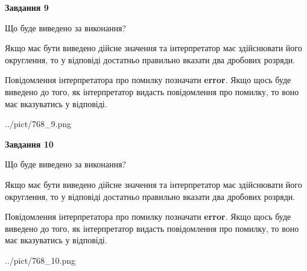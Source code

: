 \documentclass[12pt, ukrainian]{article}
\begin{document}
{\begin {Large}
{\begin {center}\textbf{Завдання 9}\end {center}}\par
Що буде виведено за виконання? \par

Якщо має бути виведено дійсне значення та інтерпретатор має здійснювати його округлення, 
то у відповіді достатньо правильно вказати два дробових розряди.

Повідомлення інтерпретатора про помилку позначати \textbf{error}.
Якщо щось буде виведено до того, як інтерпретатор видасть повідомлення про помилку, 
то воно має вказуватись у відповіді. \par

\begin{center}
	{../pict/768_9.png}
\end{center}
\newpage

{\begin {center}\textbf{Завдання 10}\end {center}}\par
Що буде виведено за виконання? \par

Якщо має бути виведено дійсне значення та інтерпретатор має здійснювати його округлення, 
то у відповіді достатньо правильно вказати два дробових розряди.

Повідомлення інтерпретатора про помилку позначати \textbf{error}.
Якщо щось буде виведено до того, як інтерпретатор видасть повідомлення про помилку, 
то воно має вказуватись у відповіді. \par

\begin{center}
	{../pict/768_10.png}
\end{center}
\newpage

\end {Large}}
\end{document}
